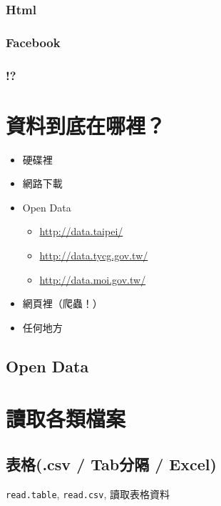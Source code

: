 \documentclass[]{book}
\providecommand{\tightlist}{%
  \setlength{\itemsep}{0pt}\setlength{\parskip}{0pt}}
\theoremstyle{definition}
\theoremstyle{definition}
\theoremstyle{remark}
\begin{document}
\subsubsection{Html}\label{html}

\subsubsection{Facebook}\label{facebook}

\subsubsection{!?}\label{section}

\section{資料到底在哪裡？}

\begin{itemize}
\tightlist
\item
  硬碟裡
\item
  網路下載
\item
  Open Data

  \begin{itemize}
  \tightlist
  \item
    \url{http://data.taipei/}
  \item
    \url{http://data.tycg.gov.tw/}
  \item
    \url{http://data.moi.gov.tw/}
  \end{itemize}
\item
  網頁裡（爬蟲！）
\item
  任何地方
\end{itemize}

\subsection{Open Data}\label{open-data}

\section{讀取各類檔案}

\subsection{表格(.csv / Tab分隔 / Excel)}\label{.csv-tab-excel}

\texttt{read.table}, \texttt{read.csv}, 讀取表格資料
\end{document}
